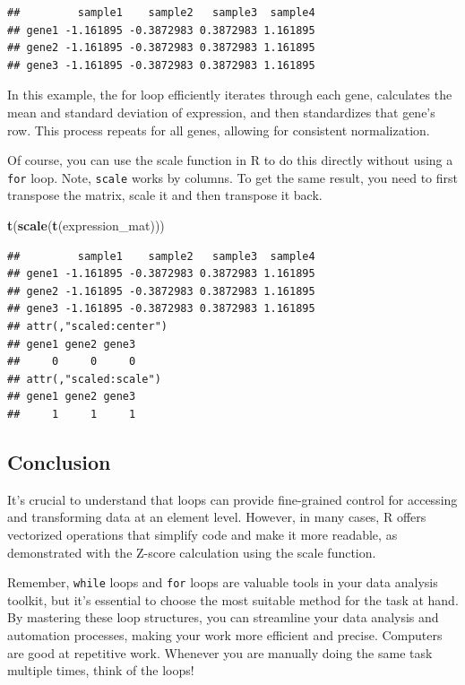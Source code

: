 \documentclass[
]{book}
\newenvironment{Shaded}{\begin{snugshade}}{\end{snugshade}}
\newcommand{\FunctionTok}[1]{\textcolor[rgb]{0.13,0.29,0.53}{\textbf{#1}}}
\newcommand{\NormalTok}[1]{#1}
\begin{document}
\begin{verbatim}
##         sample1    sample2   sample3  sample4
## gene1 -1.161895 -0.3872983 0.3872983 1.161895
## gene2 -1.161895 -0.3872983 0.3872983 1.161895
## gene3 -1.161895 -0.3872983 0.3872983 1.161895
\end{verbatim}

In this example, the for loop efficiently iterates through each gene, calculates the mean and standard deviation of expression, and then standardizes that gene's row. This process repeats for all genes, allowing for consistent normalization.

Of course, you can use the scale function in R to do this directly without using a \texttt{for} loop. Note, \texttt{scale} works by columns. To get the same result, you need to first transpose the matrix, scale it and then transpose it back.

\begin{Shaded}
\begin{Highlighting}[]
\FunctionTok{t}\NormalTok{(}\FunctionTok{scale}\NormalTok{(}\FunctionTok{t}\NormalTok{(expression\_mat)))}
\end{Highlighting}
\end{Shaded}

\begin{verbatim}
##         sample1    sample2   sample3  sample4
## gene1 -1.161895 -0.3872983 0.3872983 1.161895
## gene2 -1.161895 -0.3872983 0.3872983 1.161895
## gene3 -1.161895 -0.3872983 0.3872983 1.161895
## attr(,"scaled:center")
## gene1 gene2 gene3 
##     0     0     0 
## attr(,"scaled:scale")
## gene1 gene2 gene3 
##     1     1     1
\end{verbatim}

\hypertarget{conclusion-7}{%
\subsection{Conclusion}\label{conclusion-7}}

It's crucial to understand that loops can provide fine-grained control for accessing and transforming data at an element level. However, in many cases, R offers vectorized operations that simplify code and make it more readable, as demonstrated with the Z-score calculation using the scale function.

Remember, \texttt{while} loops and \texttt{for} loops are valuable tools in your data analysis toolkit, but it's essential to choose the most suitable method for the task at hand. By mastering these loop structures, you can streamline your data analysis and automation processes, making your work more efficient and precise. Computers are good at repetitive work.
Whenever you are manually doing the same task multiple times, think of the loops!
\end{document}
